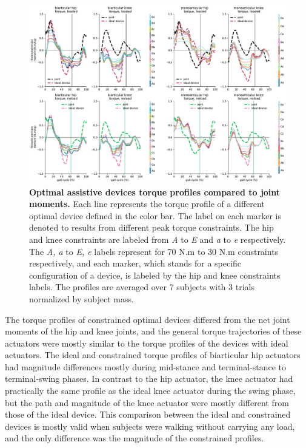 \documentclass[10pt,letterpaper]{article}
\begin{document}
\begin{figure}[ht]   
	\centering
	\includegraphics[width=\linewidth]{Pareto_Simulations_Figures/PaperFigure_Paretofront_TorqueProfiles.pdf}
	\vspace{1mm}
	\caption{{\small\textbf{Optimal assistive devices torque profiles compared to joint moments.} Each line represents the torque profile of a different optimal device defined in the color bar. The label on each marker is denoted to results from different peak torque constraints. The hip and knee constraints are labeled from {\it A} to {\it E} and {\it a} to {\it e} respectively. The {\it A, a} to {\it E, e} labels represent for 70 N.m to 30 N.m constraints respectively, and each marker, which stands for a specific configuration of a device, is labeled by the hip and knee constraints labels. The profiles are averaged over 7 subjects with 3 trials normalized by subject mass.}}
	\label{Fig_Paretofronts_Torque_Profiles}
\end{figure}
The torque profiles of constrained optimal devices differed from the net joint moments of the hip and knee joints, and the general torque trajectories of these actuators were mostly similar to the torque profiles of the devices with ideal actuators. The ideal and constrained torque profiles of biarticular hip actuators had magnitude differences mostly during mid-stance and terminal-stance to terminal-swing phases. In contrast to the hip actuator, the knee actuator had practically the same profile as the ideal knee actuator during the swing phase, but the path and magnitude of the knee actuator were mostly different from those of the ideal device. This comparison between the ideal and constrained devices is mostly valid when subjects were walking without carrying any load, and the only difference was the magnitude of the constrained profiles.\\
\end{document}

